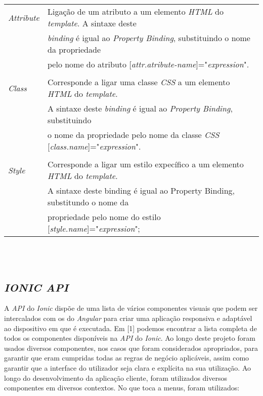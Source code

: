 \begin{tabular}{ll}
	\textit{Attribute} & Ligação de um atributo a um elemento \textit{HTML} do \textit{template}. A sintaxe deste\\
	& \textit{binding} é igual ao \textit{Property Binding}, substituindo o nome da propriedade\\
	& pelo nome do atributo [\textit{attr.atribute-name}]="\textit{expression}".\\
	\\
	\textit{Class} & Corresponde a ligar uma classe \textit{CSS} a um elemento \textit{HTML} do \textit{template}. \\
	&A sintaxe deste \textit{binding} é igual ao \textit{Property Binding}, substituindo \\
	&o nome da propriedade pelo nome da classe \textit{CSS} [\textit{class.name}]="\textit{expression}".\\
	\\
	\textit{Style} & Corresponde a ligar um estilo expecífico a um elemento \textit{HTML} do \textit{template}. \\
	&A sintaxe deste binding é igual ao Property Binding, substitundo o nome da \\
	&propriedade pelo nome do estilo [\textit{style.name}]="\textit{expression}";\\
\end{tabular}
\\
\\
\newpage

\subsection{\textit{IONIC API}}\label{subsec414}

A \textit{API} do \textit{Ionic} dispõe de uma lista de vários componentes visuais que podem ser intercalados com os do \textit{Angular} para criar uma aplicação responsiva e adaptável ao dispositivo em que é executada. Em [1] podemos encontrar a lista completa de todos os componentes disponíveis na \textit{API} do \textit{Ionic}. Ao longo deste projeto foram usados diversos componentes, nos casos que foram considerados apropriados, para garantir que eram cumpridas todas as regras de negócio aplicáveis, assim como garantir que a interface do utilizador seja clara e explícita na sua utilização.
Ao longo do desenvolvimento da aplicação cliente, foram utilizados diversos componentes em diversos contextos. No que toca a menus, foram utilizados:\\


